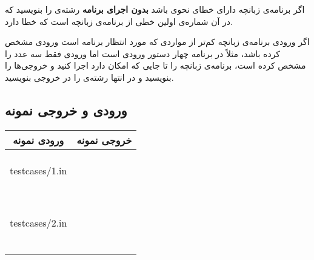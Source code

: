 \documentclass{utap}
\begin{document}
    اگر برنامه‌ی زبانچه دارای خطای نحوی باشد \textbf{بدون اجرای برنامه} رشته‌ی  را بنویسید که در آن  شماره‌ی اولین خطی از برنامه‌ی زبانچه است که خطا دارد.

    اگر ورودی برنامه‌ی زبانچه کم‌تر از مواردی که مورد انتظار برنامه است ورودی مشخص کرده باشد، مثلاً در برنامه چهار دستور ورودی است اما ورودی فقط سه عدد را مشخص کرده است، برنامه‌ی زبانچه را تا جایی که امکان دارد اجرا کنید و خروجی‌ها را بنویسید و در انتها رشته‌ی  را در خروجی بنویسید.


    \subsection{ورودی و خروجی نمونه}
    \begin{table}[H]
        \centering
        \begin{tabular}{|c|c|}
            \hline
            ورودی نمونه & خروجی نمونه\\
            \hline
            \hline
            \begin{latin}\begin{minipage}[]{0.3\textwidth}\footnotesize
            {\begin{lstinputlisting}[numbers=left,language=zabanche,basicstyle=\footnotesize\ttfamily\color{Gray}]{testcases/1.in}
            \end{lstinputlisting}}
            \end{minipage}\end{latin}
            &
            \begin{latin}\begin{minipage}[]{0.3\textwidth}\footnotesize
            
            \begin{verbatim}



            \end{verbatim}
            \end{minipage}\end{latin}
            \\
            \hline
            \begin{latin}\begin{minipage}[]{0.3\textwidth}\footnotesize
            {\begin{lstinputlisting}[numbers=left,language=zabanche,basicstyle=\footnotesize\ttfamily\color{Gray}]{testcases/2.in}
            \end{lstinputlisting}}
            \end{minipage}\end{latin}
            &
            \begin{latin}\begin{minipage}[]{0.3\textwidth}\footnotesize
            
            \begin{verbatim}





\end{verbatim}
\end{minipage}
\end{latin}
\end{tabular}
\end{table}
\end{document}
